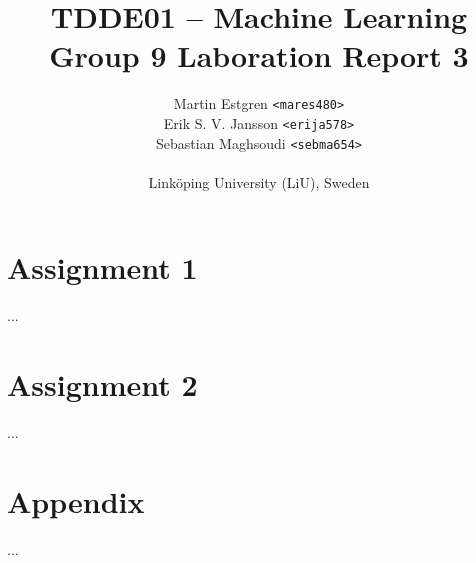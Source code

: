 \documentclass[a4paper, twocolumn]{article}
\title{TDDE01 -- Machine Learning \\
       Group 9 Laboration Report 3}
\author{{Martin Estgren \texttt{<mares480>}} \\
        {Erik S. V. Jansson \texttt{<erija578>}} \\
        {Sebastian Maghsoudi \texttt{<sebma654>}} \\~\\
        {Linköping University (LiU), Sweden}}
\begin{document}
    \maketitle %

    \section*{Assignment 1}

        ...

    \section*{Assignment 2}

        ...

    \nocite{*} %
    
    
    \onecolumn \appendix
    \section*{Appendix}

        ...
\end{document}
